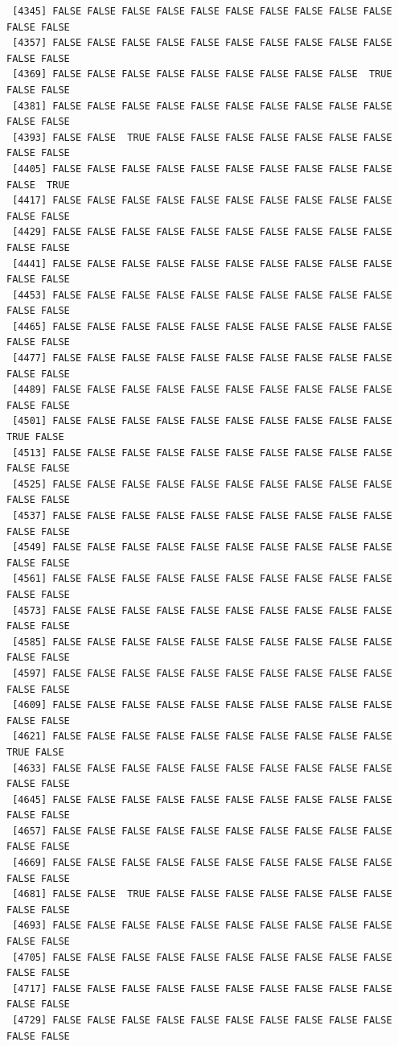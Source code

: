 \documentclass[
  a4paper,
  DIV=11,
  numbers=noendperiod]{scrartcl}
\begin{document}
\begin{verbatim}
 [4345] FALSE FALSE FALSE FALSE FALSE FALSE FALSE FALSE FALSE FALSE FALSE FALSE
 [4357] FALSE FALSE FALSE FALSE FALSE FALSE FALSE FALSE FALSE FALSE FALSE FALSE
 [4369] FALSE FALSE FALSE FALSE FALSE FALSE FALSE FALSE FALSE  TRUE FALSE FALSE
 [4381] FALSE FALSE FALSE FALSE FALSE FALSE FALSE FALSE FALSE FALSE FALSE FALSE
 [4393] FALSE FALSE  TRUE FALSE FALSE FALSE FALSE FALSE FALSE FALSE FALSE FALSE
 [4405] FALSE FALSE FALSE FALSE FALSE FALSE FALSE FALSE FALSE FALSE FALSE  TRUE
 [4417] FALSE FALSE FALSE FALSE FALSE FALSE FALSE FALSE FALSE FALSE FALSE FALSE
 [4429] FALSE FALSE FALSE FALSE FALSE FALSE FALSE FALSE FALSE FALSE FALSE FALSE
 [4441] FALSE FALSE FALSE FALSE FALSE FALSE FALSE FALSE FALSE FALSE FALSE FALSE
 [4453] FALSE FALSE FALSE FALSE FALSE FALSE FALSE FALSE FALSE FALSE FALSE FALSE
 [4465] FALSE FALSE FALSE FALSE FALSE FALSE FALSE FALSE FALSE FALSE FALSE FALSE
 [4477] FALSE FALSE FALSE FALSE FALSE FALSE FALSE FALSE FALSE FALSE FALSE FALSE
 [4489] FALSE FALSE FALSE FALSE FALSE FALSE FALSE FALSE FALSE FALSE FALSE FALSE
 [4501] FALSE FALSE FALSE FALSE FALSE FALSE FALSE FALSE FALSE FALSE  TRUE FALSE
 [4513] FALSE FALSE FALSE FALSE FALSE FALSE FALSE FALSE FALSE FALSE FALSE FALSE
 [4525] FALSE FALSE FALSE FALSE FALSE FALSE FALSE FALSE FALSE FALSE FALSE FALSE
 [4537] FALSE FALSE FALSE FALSE FALSE FALSE FALSE FALSE FALSE FALSE FALSE FALSE
 [4549] FALSE FALSE FALSE FALSE FALSE FALSE FALSE FALSE FALSE FALSE FALSE FALSE
 [4561] FALSE FALSE FALSE FALSE FALSE FALSE FALSE FALSE FALSE FALSE FALSE FALSE
 [4573] FALSE FALSE FALSE FALSE FALSE FALSE FALSE FALSE FALSE FALSE FALSE FALSE
 [4585] FALSE FALSE FALSE FALSE FALSE FALSE FALSE FALSE FALSE FALSE FALSE FALSE
 [4597] FALSE FALSE FALSE FALSE FALSE FALSE FALSE FALSE FALSE FALSE FALSE FALSE
 [4609] FALSE FALSE FALSE FALSE FALSE FALSE FALSE FALSE FALSE FALSE FALSE FALSE
 [4621] FALSE FALSE FALSE FALSE FALSE FALSE FALSE FALSE FALSE FALSE  TRUE FALSE
 [4633] FALSE FALSE FALSE FALSE FALSE FALSE FALSE FALSE FALSE FALSE FALSE FALSE
 [4645] FALSE FALSE FALSE FALSE FALSE FALSE FALSE FALSE FALSE FALSE FALSE FALSE
 [4657] FALSE FALSE FALSE FALSE FALSE FALSE FALSE FALSE FALSE FALSE FALSE FALSE
 [4669] FALSE FALSE FALSE FALSE FALSE FALSE FALSE FALSE FALSE FALSE FALSE FALSE
 [4681] FALSE FALSE  TRUE FALSE FALSE FALSE FALSE FALSE FALSE FALSE FALSE FALSE
 [4693] FALSE FALSE FALSE FALSE FALSE FALSE FALSE FALSE FALSE FALSE FALSE FALSE
 [4705] FALSE FALSE FALSE FALSE FALSE FALSE FALSE FALSE FALSE FALSE FALSE FALSE
 [4717] FALSE FALSE FALSE FALSE FALSE FALSE FALSE FALSE FALSE FALSE FALSE FALSE
 [4729] FALSE FALSE FALSE FALSE FALSE FALSE FALSE FALSE FALSE FALSE FALSE FALSE

\end{verbatim}
\end{document}
